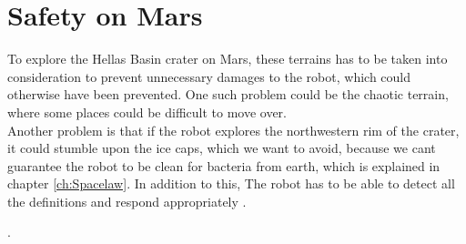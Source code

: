 \newpage
\section{Safety on Mars}
To explore the Hellas Basin crater on Mars, these terrains has to be taken into consideration to prevent unnecessary damages to the robot, which could otherwise have been prevented.
One such problem could be the chaotic terrain, where some places could be difficult to move over.\\
Another problem is that if the robot explores the northwestern rim of the crater, it could stumble upon the ice caps, which we want to avoid, because we cant guarantee the robot to be clean for bacteria from earth, which is explained in chapter \ref{ch:Spacelaw}. In addition to this, The robot has to be able to detect all the definitions and respond appropriately \cite{AspectsWeather}.




.





